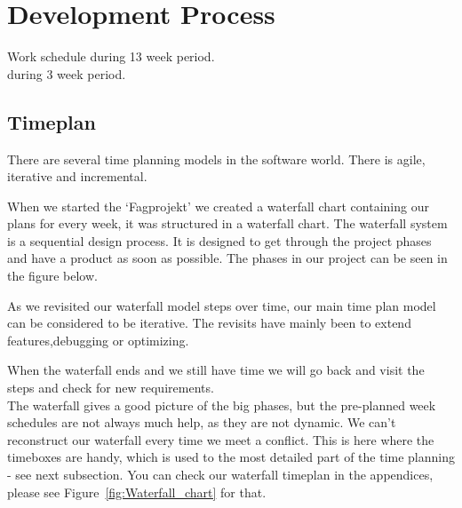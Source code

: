 \chapter{Development Process}
Work schedule during 13 week period.\\
       during 3 week period.
       \section{Timeplan}%

       There are several time planning models in the software world. There is agile, iterative
       and incremental.

       When we started the `Fagprojekt' we created a waterfall chart containing our plans
       for every week, it was structured in a waterfall chart. The waterfall system is a
       sequential design process.
       It is designed to get through the project phases and have a product as soon as
       possible. The phases in our project can be seen in the figure below.

       As we revisited our waterfall model steps over time, our main
       time plan model can be considered to be iterative. The revisits have mainly
       been to extend features,debugging or optimizing.

       When the waterfall ends and we still have time
       we will go back and visit the steps and check for new requirements.
       \\The waterfall gives
       a good picture of the big phases, but the pre-planned week schedules are
       not always much help, as they are not dynamic. We can't reconstruct our waterfall every
       time we meet a conflict. This is here where the timeboxes are handy, which is used
       to the most detailed part of the time planning - see next subsection.
       You can check our waterfall timeplan in the appendices, please
       see Figure~\ref{fig:Waterfall_chart} for that.

